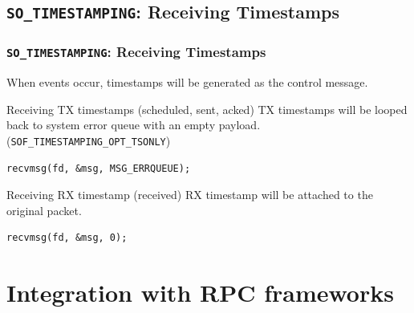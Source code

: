 \documentclass[10pt]{beamer}
\begin{document}
\subsection{\texttt{SO\_TIMESTAMPING}: Receiving Timestamps}
\begin{frame}[fragile]
\frametitle{\texttt{SO\_TIMESTAMPING}: Receiving Timestamps}
    When events occur, timestamps will be generated as the control message.
\begin{block}{\normalsize Receiving TX timestamps (scheduled, sent, acked)}
      TX timestamps will be looped back to system error queue with an empty
      payload. (\small\texttt{SOF\_TIMESTAMPING\_OPT\_TSONLY})
      {\small
      \begin{verbatim}
recvmsg(fd, &msg, MSG_ERRQUEUE);\end{verbatim}
      }
\end{block}
\begin{block}{\normalsize Receiving RX timestamp (received)}
      RX timestamp will be attached to the original packet.
      {\small
      \begin{verbatim}
recvmsg(fd, &msg, 0);\end{verbatim}
      }
\end{block}
\end{frame}


\section{Integration with RPC frameworks}

\end{document}
